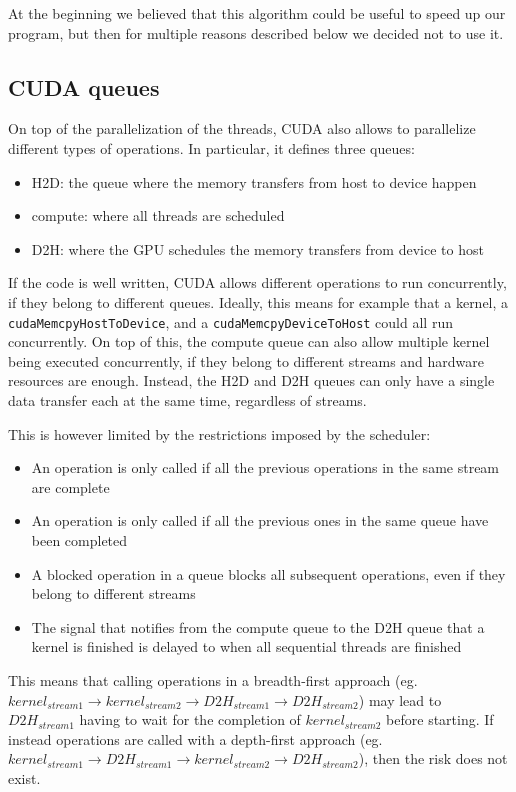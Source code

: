 At the beginning we believed that this algorithm could be useful to speed up our program, but then for multiple reasons described below we decided not to use it.


\newpage
\subsection{CUDA queues}

On top of the parallelization of the threads, CUDA also allows to parallelize different types of operations.
In particular, it defines three queues:
\begin{itemize}
	\itemsep 0em
	\item H2D: the queue where the memory transfers from host to device happen
	\item compute: where all threads are scheduled
	\item D2H: where the GPU schedules the memory transfers from device to host
\end{itemize}
If the code is well written, CUDA allows different operations to run concurrently, if they belong to different queues.
Ideally, this means for example that a kernel, a \texttt{cudaMemcpyHostToDevice}, and a \texttt{cudaMemcpyDeviceToHost} could all run concurrently.
On top of this, the compute queue can also allow multiple kernel being executed concurrently, if they belong to different streams and hardware resources are enough.
Instead, the H2D and D2H queues can only have a single data transfer each at the same time, regardless of streams.

This is however limited by the restrictions imposed by the scheduler:
\begin{itemize}
	\itemsep 0em
	\item An operation is only called if all the previous operations in the same stream are complete
	\item An operation is only called if all the previous ones in the same queue have been completed
	\item A blocked operation in a queue blocks all subsequent operations, even if they belong to different streams
	\item The signal that notifies from the compute queue to the D2H queue that a kernel is finished is delayed to when all sequential threads are finished
\end{itemize}
This means that calling operations in a breadth-first approach (eg. $kernel_{stream1} \rightarrow kernel_{stream 2} \rightarrow D2H_{stream 1} \rightarrow D2H_{stream 2}$) may lead to $D2H_{stream 1}$ having to wait for the completion of $kernel_{stream 2}$ before starting.
If instead operations are called with a depth-first approach (eg. $kernel_{stream1} \rightarrow D2H_{stream 1}  \rightarrow kernel_{stream 2}\rightarrow D2H_{stream 2}$), then the risk does not exist.

